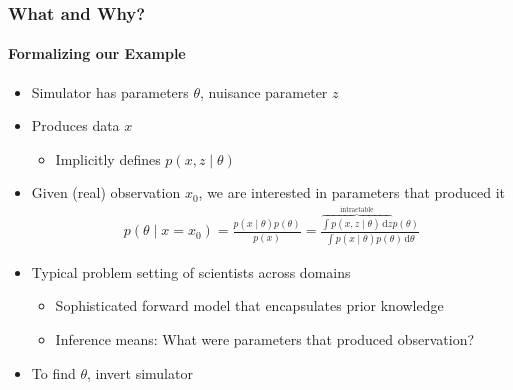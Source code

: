 \documentclass[9pt, aspectratio=169]{beamer}
\newcommand{\diff}{\,\mathrm{d}}
\begin{document}
\begin{frame}
\frametitle{What and Why?}
\framesubtitle{Formalizing our Example}
\begin{itemize}
	\item Simulator has parameters $\theta$, nuisance parameter $z$
	\item Produces data $x$
	\begin{itemize}
		\item Implicitly defines $p(x,z\mid\theta)$ %
	\end{itemize}
	\item Given (real) observation $x_0$, we are interested in parameters that produced it
	\begin{align}
p(\theta\mid x=x_0) = \frac{p(x\mid\theta)p(\theta)}{p(x)} = \frac{\overbrace{\int p(x,z\mid\theta)\diff z}^{\text{intractable}} p(\theta)}{\int p(x\mid\theta)p(\theta) \diff \theta}
\end{align}
\item Typical problem setting of scientists across domains
\begin{itemize}
			\item Sophisticated forward model that encapsulates prior knowledge
	\item Inference means: What were parameters that produced observation?
\end{itemize}
\item To find $\theta$, invert simulator
\end{itemize}
\end{frame} 
\end{document}
